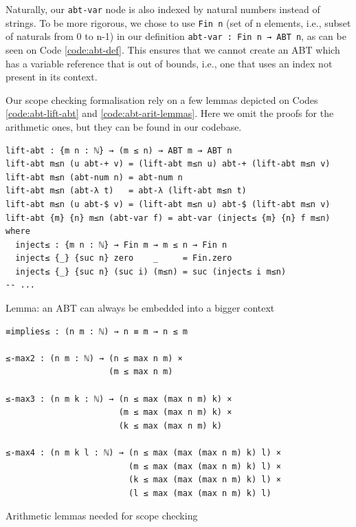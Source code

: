 Naturally, our \verb$abt-var$ node is also indexed by natural numbers instead of strings. To be more rigorous, we chose to use \verb$Fin n$ (set of n elements, i.e., subset of naturals from 0 to n-1) in our definition \verb$abt-var : Fin n → ABT n$, as can be seen on Code \ref{code:abt-def}. This ensures that we cannot create an ABT which has a variable reference that is out of bounds, i.e., one that uses an index not present in its context.

Our scope checking formalisation rely on a few lemmas depicted on Codes \ref{code:abt-lift-abt} and \ref{code:abt-arit-lemmas}. Here we omit the proofs for the arithmetic ones, but they can be found in our codebase.

\begin{listing}[H]
\begin{verbatim}
lift-abt : {m n : ℕ} → (m ≤ n) → ABT m → ABT n
lift-abt m≤n (u abt-+ v) = (lift-abt m≤n u) abt-+ (lift-abt m≤n v)
lift-abt m≤n (abt-num n) = abt-num n
lift-abt m≤n (abt-λ t)   = abt-λ (lift-abt m≤n t)
lift-abt m≤n (u abt-$ v) = (lift-abt m≤n u) abt-$ (lift-abt m≤n v)
lift-abt {m} {n} m≤n (abt-var f) = abt-var (inject≤ {m} {n} f m≤n) where
  inject≤ : {m n : ℕ} → Fin m → m ≤ n → Fin n
  inject≤ {_} {suc n} zero    _     = Fin.zero
  inject≤ {_} {suc n} (suc i) (m≤n) = suc (inject≤ i m≤n)
-- ...
\end{verbatim}
\caption{Lemma: an ABT can always be embedded into a bigger context}
\label{code:abt-lift-abt}
\end{listing}

\begin{listing}[H]
\begin{verbatim}
≡implies≤ : (n m : ℕ) → n ≡ m → n ≤ m

≤-max2 : (n m : ℕ) → (n ≤ max n m) ×
                     (m ≤ max n m)

≤-max3 : (n m k : ℕ) → (n ≤ max (max n m) k) ×
                       (m ≤ max (max n m) k) ×
                       (k ≤ max (max n m) k)

≤-max4 : (n m k l : ℕ) → (n ≤ max (max (max n m) k) l) ×
                         (m ≤ max (max (max n m) k) l) ×
                         (k ≤ max (max (max n m) k) l) ×
                         (l ≤ max (max (max n m) k) l)
\end{verbatim}
\caption{Arithmetic lemmas needed for scope checking}
\label{code:abt-arit-lemmas}
\end{listing}

